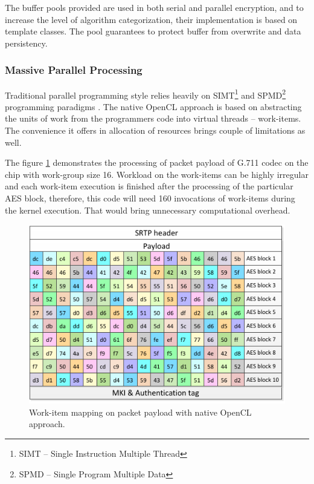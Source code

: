 The buffer pools provided are used in both serial and parallel encryption,
and to increase the level of algorithm categorization, their implementation is
based on template classes. The pool guarantees to protect buffer from overwrite
and data persistency.


\newpage

\subsubsection*{Massive Parallel Processing}
Traditional parallel programming style relies heavily on SIMT\footnote{ SIMT -- 
Single Instruction Multiple Thread} and SPMD\footnote{ SPMD -- Single Program
Multiple Data} programming paradigms \cite{Flynn:1972}. The native OpenCL 
approach is based on abstracting the units of work from the programmers code 
into virtual threads -- work-items. The convenience it offers in allocation
of resources brings couple of limitations as well. 

The figure \ref{mp_payload} demonstrates the processing of packet payload of 
G.711 codec on the chip with work-group size 16. Workload on the work-items can
be highly irregular and each work-item execution is finished after the 
processing of the particular AES block, therefore, this code will need 160
invocations of work-items during the kernel execution. That would bring
unnecessary computational overhead.    

\begin{figure}[H]
\centering
\includegraphics[width=12cm]{fig/packet_mp.pdf}
\caption[OpenCL work-item mapping]{Work-item mapping on packet payload with 
native OpenCL approach.}
\label{mp_payload}
\end{figure}



